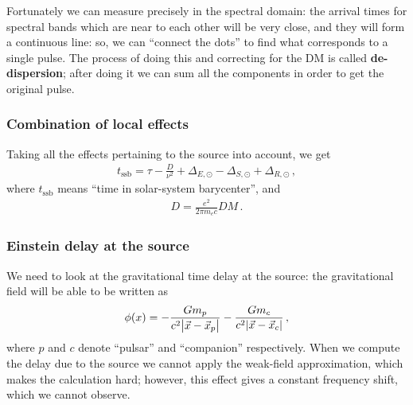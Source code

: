 \documentclass[main.tex]{subfiles}
\begin{document}
Fortunately we can measure precisely in the spectral domain: the arrival times for spectral bands which are near to each other will be very close, and they will form a continuous line:
so, we can ``connect the dots'' to find what corresponds to a single pulse.
The process of doing this and correcting for the DM is called \textbf{de-dispersion}; after doing it we can sum all the components in order to get the original pulse. 

\subsubsection{Combination of local effects}

Taking all the effects pertaining to the source into account, we get 
%
\begin{align}
t _{\text{ssb}} = \tau - \frac{D}{\nu^2} + \Delta_{E, {\odot}} - \Delta_{S, {\odot}} + \Delta_{R, {\odot}}
\,,
\end{align}
%
where \(t _{\text{ssb}}\) means ``time in solar-system barycenter'', and
%
\begin{align}
D = \frac{e^2}{2 \pi m_e c} DM
\,.
\end{align}

\subsubsection{Einstein delay at the source}

We need to look at the gravitational time delay at the source: the gravitational field will be able to be written as 
%
\begin{align}
\phi (x) = 
- \frac{G m_p}{c^2 \abs{\vec{x} - \vec{x}_p}}
- \frac{G m_c}{c^2 \abs{\vec{x} - \vec{x}_c}}
\,,
\end{align}
%
where \(p\) and \(c\) denote ``pulsar'' and ``companion'' respectively. 
When we compute the delay due to the source we cannot apply the weak-field approximation, which makes the calculation hard; however, this effect gives a constant frequency shift, which we cannot observe.
\end{document}
